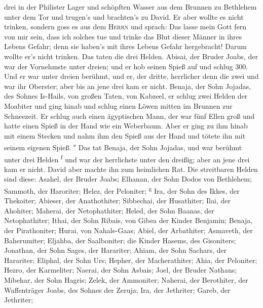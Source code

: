 drei in der Philister Lager und schöpften Wasser aus dem Brunnen zu
Bethlehem unter dem Tor und trugen's und brachten's zu David. Er aber
wollte es nicht trinken, sondern goss es aus dem \textsc{Herrn}
 und sprach: Das lasse mein Gott fern von mir sein, dass
ich solches tue und trinke das Blut dieser Männer in ihres Lebens
Gefahr; denn sie haben's mit ihres Lebens Gefahr hergebracht! Darum
wollte er's nicht trinken. Das taten die drei Helden. 
Abisai, der Bruder Joabs, der war der Vornehmste unter dreien; und er
hob seinen Spieß auf und schlug 300. Und er war unter dreien berühmt,
 und er, der dritte, herrlicher denn die zwei und war ihr
Oberster; aber bis an jene drei kam er nicht.  Benaja,
der Sohn Jojadas, des Sohnes Is-Hails, von großen Taten, von Kabzeel, er
schlug zwei Helden der Moabiter und ging hinab und schlug einen Löwen
mitten im Brunnen zur Schneezeit.  Er schlug auch einen
ägyptischen Mann, der war fünf Ellen groß und hatte einen Spieß in der
Hand wie ein Weberbaum. Aber er ging zu ihm hinab mit einem Stecken und
nahm ihm den Spieß aus der Hand und tötete ihn mit seinem eigenen Spieß.
\textsuperscript{e}  Das tat Benaja, der Sohn Jojadas,
und war berühmt unter drei Helden \textsuperscript{f} 
und war der herrlichste unter den dreißig; aber an jene drei kam er
nicht. David aber machte ihn zum heimlichen Rat.  Die
streitbaren Helden sind diese: Asahel, der Bruder Joabs; Elhanan, der
Sohn Dodos von Bethlehem;  Sammoth, der Haroriter; Helez,
der Peloniter; \textsuperscript{g}  Ira, der Sohn des
Ikkes, der Thekoiter; Abieser, der Anathothiter; 
Sibbechai, der Husathiter; Ilai, der Ahohiter;  Maherai,
der Netophathiter; Heled, der Sohn Baanas, der Netophathiter;
 Ithai, der Sohn Ribais, von Gibea der Kinder Benjamin;
Benaja, der Pirathoniter;  Hurai, von Nahale-Gaas; Abiel,
der Arbathiter;  Asmaveth, der Baherumiter; Eljahba, der
Saalboniter;  die Kinder Hasems, des Gisoniters;
Jonathan, der Sohn Sages, der Harariter;  Ahiam, der Sohn
Sachars, der Harariter; Eliphal, der Sohn Urs;  Hepher,
der Macherathiter; Ahia, der Peloniter;  Hezro, der
Karmeliter; Naerai, der Sohn Asbais;  Joel, der Bruder
Nathans; Mibehar, der Sohn Hagris;  Zelek, der Ammoniter;
Naherai, der Berothiter, der Waffenträger Joabs, des Sohnes der Zeruja;
 Ira, der Jethriter; Gareb, der Jethriter;

